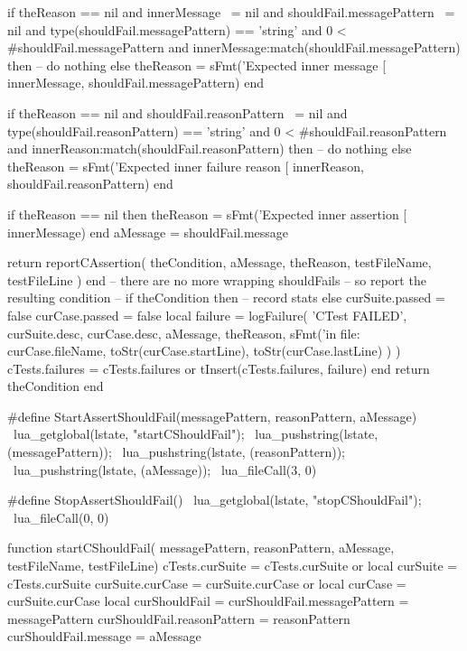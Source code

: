     if theReason == nil
      and innerMessage ~= nil
      and shouldFail.messagePattern ~= nil
      and type(shouldFail.messagePattern) == 'string'
      and 0 < #shouldFail.messagePattern
      and innerMessage:match(shouldFail.messagePattern) then
      -- do nothing
    else
      theReason = sFmt('Expected inner message [%
        innerMessage, shouldFail.messagePattern)
    end

    if theReason == nil
      and shouldFail.reasonPattern ~= nil
      and type(shouldFail.reasonPattern) == 'string'
      and 0 < #shouldFail.reasonPattern
      and innerReason:match(shouldFail.reasonPattern) then
      -- do nothing
    else
      theReason = sFmt('Expected inner failure reason [%
        innerReason, shouldFail.reasonPattern)
    end
    
    if theReason == nil then
      theReason = sFmt('Expected inner assertion [%
        innerMessage)
    end
    aMessage = shouldFail.message
    
    return reportCAssertion(
      theCondition,
      aMessage,
      theReason,
      testFileName,
      testFileLine
    )
  end
  -- there are no more wrapping shouldFails
  -- so report the resulting condition
  --
  if theCondition then
    -- record stats
  else
    curSuite.passed = false
    curCase.passed  = false
    local failure = logFailure(
      'CTest FAILED',
      curSuite.desc,
      curCase.desc,
      aMessage,
      theReason,
      sFmt('in file: %
        curCase.fileName,
        toStr(curCase.startLine),
        toStr(curCase.lastLine)
      )
    )
    cTests.failures = cTests.failures or { }
    tInsert(cTests.failures, failure)
  end
  return theCondition
end
\stopLuaCode


\startCHeader
#define StartAssertShouldFail(messagePattern, reasonPattern, aMessage) \
  lua_getglobal(lstate, "startCShouldFail");                           \
  lua_pushstring(lstate, (messagePattern));                            \
  lua_pushstring(lstate, (reasonPattern));                             \
  lua_pushstring(lstate, (aMessage));                                  \
  lua_fileCall(3, 0)

#define StopAssertShouldFail()              \
  lua_getglobal(lstate, "stopCShouldFail"); \
  lua_fileCall(0, 0)
\stopCHeader

\startLuaCode
function startCShouldFail(
  messagePattern, reasonPattern, aMessage,
  testFileName, testFileLine)
  cTests.curSuite    = cTests.curSuite or { }
  local curSuite     = cTests.curSuite
  curSuite.curCase   = curSuite.curCase or { }
  local curCase      = curSuite.curCase
  local curShouldFail   = { }
  curShouldFail.messagePattern = messagePattern
  curShouldFail.reasonPattern  = reasonPattern
  curShouldFail.message        = aMessage
  
